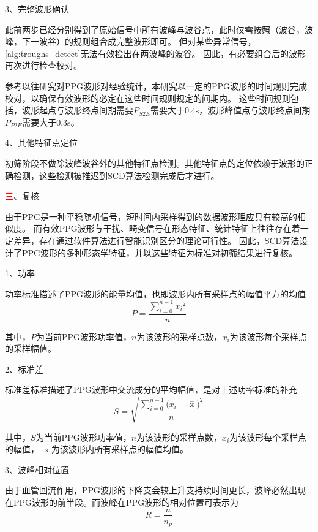 3、完整波形确认

此前两步已经分别得到了原始信号中所有波峰与波谷点，此时仅需按照（波谷，波峰，下一波谷）的规则组合成完整波形即可。
但对某些异常信号，\autoref{alg:troughs_detect}无法有效检出在两波峰的波谷。
因此，有必要组合后的波形再次进行检查校对。

参考以往研究对PPG波形对经验统计，本研究以一定的PPG波形的时间规则完成校对，以确保有效波形的必定在这些时间规则规定的间期内。
这些时间规则包括，波形起点与波形终点间期需要$P_{S2E}$需要大于0.4s，波形峰值点与波形终点间期$P_{P2E}$需要大于0.3s。

4、其他特征点定位

初筛阶段不做除波峰波谷外的其他特征点检测。其他特征点的定位依赖于波形的正确检测，这些检测被推迟到SCD算法检测完成后才进行。

\textcolor{red}{三}、复核

由于PPG是一种平稳随机信号，短时间内采样得到的数据波形理应具有较高的相似度\cite{Qiu2012}。
而有效PPG波形与干扰、畸变信号在形态特征、统计特征上往往存在着一定差异，存在通过软件算法进行智能识别区分的理论可行性。
因此，SCD算法设计了PPG波形的多种形态学特征，并以这些特征为标准对初筛结果进行复核。

1、功率

功率标准描述了PPG波形的能量均值，也即波形内所有采样点的幅值平方的均值
\begin{equation}
    \label{equ:ppgp}
    P=\frac{\sum_{i=0}^{n-1}{x_i}^2}{n}
\end{equation}

其中，$P$为当前PPG波形功率值，$n$为该波形的采样点数，$x_i$为该波形每个采样点的采样幅值。

2、标准差

标准差标准描述了PPG波形中交流成分的平均幅值，是对上述功率标准的补充
\begin{equation}
    \label{equ:ppgstd}
    S=\sqrt{\frac{\sum_{i=0}^{n-1}{(x_i-\mathop{x} \limits^-})^2}{n}}
\end{equation}

其中，$S$为当前PPG波形功率值，$n$为该波形的采样点数，$x_i$为该波形每个采样点的幅值， $\mathop{x} \limits^-$为该波形内所有采样点的幅值均值。

3、波峰相对位置 

由于血管回流作用，PPG波形的下降支会较上升支持续时间更长，波峰必然出现在PPG波形的前半段。而波峰在PPG波形的相对位置可表示为
\begin{equation}
    \label{equ:rpeak}
    R = \frac{n}{n_p}
\end{equation}

